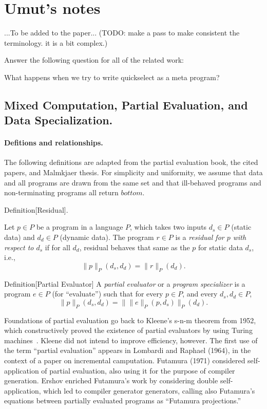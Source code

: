 
\section{Umut's notes}

...To be added to the paper...
(TODO: make a pass to make consistent the terminology. it is a bit complex.)

Answer the following question for all of the related work:

What happens when we try to write quickselect as a meta program? 

\newcommand{\drun}[2]{\lVert{#2}\rVert_{#1}}

\subsection{Mixed Computation, Partial Evaluation, and Data Specialization.}

\paragraph{Defitions and relationships.}
The following definitions are adapted from the partial evaluation
book, the cited papers, and Malmkjaer thesis.  For simplicity and
uniformity, we assume that data and all programs are drawn from the
same set and that ill-behaved programs and non-terminating programs
all return $bottom$.

Definition[Residual].  

Let $p \in P$ be a program in a language $P$, which takes two inputs
$d_s \in P$ (static data) and $d_d \in P$ (dynamic data).  The program
$r \in P$ is a {\em residual for $p$ with respect to $d_s$} if for all
$d_d$, residual behaves that same as the $p$ for static data $d_s$,
i.e., 
\[
\drun{P}{p} (d_s, d_d) = \drun{P}{r} (d_d).
\]


Definition[Partial Evaluator]
A {\em partial evaluator} or a {\em program specializer} is a program
$e \in P$ (for ``evaluate'') such that for every $p \in P$, and every
$d_s, d_d \in P$, 
\[
\drun{P}{p} (d_s, d_d) = \drun{P}{\drun{P}{e}(p, d_s)} (d_d).
\]

Foundations of partial evaluation go back to Kleene's s-n-m theorem
from 1952, which constructively proved the existence of partial
evaluators by using Turing machines~\cite{Kleene52}.  Kleene did not
intend to improve efficiency, however. The first use of the term
``partial evaluation'' appears in Lombardi and Raphael (1964), in the
context of a paper on incremental camputation. Futamura (1971)
considered self-application of partial evaluation, also using it for
the purpose of compiler generation.  Ershov enriched Futamura's work
by considering double self-application, which led to compiler
generator generators, calling also Futamura's equations between
partially evaluated programs as ``Futamura projections.''  


